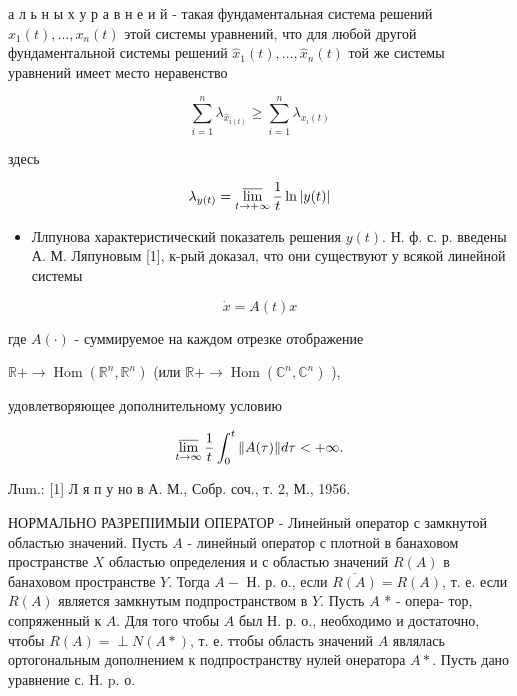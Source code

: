 \documentclass[10pt]{article}
\begin{document}
а л ь н ы х у р а в н е и й - такая фундаментальная система решений $x_{1}(t), \ldots, x_{n}(t)$ этой системы уравнений, что для любой другой фундаментальной системы решений $\hat{x}_{1}(t), \ldots, \hat{x}_{n}(t)$ той же системы уравнений имеет место неравенство



\[

\sum_{i=1}^{n} \lambda_{\hat{x}_{i(t)}} \geqslant \sum_{i=1}^{n} \lambda_{x_{i}(t)}

\]



здесь



\[

\lambda_{y(t)}=\varlimsup_{t \rightarrow+\infty} \frac{1}{t} \ln |y(t)|

\]



\begin{itemize}

  \item Ллпунова характеристический показатель решения $y(t)$. Н. ф. с. р. введены А. М. Ляпуновым [1], к-рый доказал, что они существуют у всякой линейной системы

\end{itemize}



\[

\dot{x}=A(t) x

\]



где $A(\cdot)$ - суммируемое на каждом отрезке отображение



$\mathbb{R}+\longrightarrow \operatorname{Hom}\left(\mathbb{R}^{n}, \mathbb{R}^{n}\right)$ (или $\mathbb{R}+\longrightarrow \operatorname{Hom}\left(\mathbb{C}^{n}, \mathbb{C}^{n}\right)$ ),



удовлетворяющее дополнительному условию



\[

\varlimsup_{t \rightarrow \infty} \frac{1}{t} \int_{0}^{t}\|A(\tau)\| d \tau<+\infty .

\]



Лum.: [1] Л я п у но в А. М., Собр. соч., т. 2, М., 1956.



НОРМАЛЬНО РАЗРЕПІИМЫИ ОПЕРАТОР - Линейный оператор с замкнутой областью значений. Пусть $A$ - линейный оператор с плотной в банаховом пространстве $X$ областью определения и с областью значений $R(A)$ в банаховом пространстве $Y$. Тогда $A-$ Н. р. о., если $\overline{R(A)}=R(A)$, т. е. если $R(A)$ является замкнутым подпространством в $Y$. Пусть $A$ * - опера- тор, сопряженный к $A$. Для того чтобы $A$ был Н. р. о., необходимо и достаточно, чтобы $R(A)=\perp N(A *)$, т. е. ттобы область значений $A$ являлась ортогональным дополнением к подпространству нулей онератора $A *$. Пусть дано уравнение с. Н. p. о.
\end{document}
